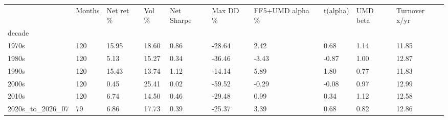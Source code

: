 \begin{tabular}{llllllllll}
\toprule
 & Months & Net ret \% & Vol \% & Net Sharpe & Max DD \% & FF5+UMD alpha \% & t(alpha) & UMD beta & Turnover x/yr \\
decade &  &  &  &  &  &  &  &  &  \\
\midrule
1970s & 120 & 15.95 & 18.60 & 0.86 & -28.64 & 2.42 & 0.68 & 1.14 & 11.85 \\
1980s & 120 & 5.13 & 15.27 & 0.34 & -36.46 & -3.43 & -0.87 & 1.00 & 12.87 \\
1990s & 120 & 15.43 & 13.74 & 1.12 & -14.14 & 5.89 & 1.80 & 0.77 & 11.83 \\
2000s & 120 & 0.45 & 25.41 & 0.02 & -59.52 & -0.29 & -0.08 & 0.97 & 12.99 \\
2010s & 120 & 6.74 & 14.50 & 0.46 & -29.48 & 0.99 & 0.34 & 1.12 & 12.58 \\
2020s\_to\_2026\_07 & 79 & 6.86 & 17.73 & 0.39 & -25.37 & 3.39 & 0.68 & 0.82 & 12.86 \\
\bottomrule
\end{tabular}
